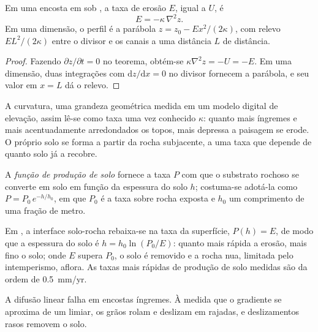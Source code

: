 \begin{proposition}\label{prop:b3:quantitative-geomorphology:curvature}
Em uma encosta em  sob , a taxa de erosão
$E$, igual a $U$, é
\[
E = -\kappa\,\nabla^2 z .
\]
Em uma dimensão, o perfil é a parábola $z = z_0 - E x^2/(2\kappa)$,
com relevo $E L^2/(2\kappa)$ entre o divisor e os canais a uma distância
$L$ de distância.
\end{proposition}

\begin{proof}
Fazendo $\partial z/\partial t = 0$ no teorema, obtém-se $\kappa\nabla^2 z =
-U = -E$. Em uma dimensão, duas integrações com $\mathrm{d}z/\mathrm{d}x =
0$ no divisor fornecem a parábola, e seu valor em $x = L$ dá o relevo.
\end{proof}

A curvatura, uma grandeza geométrica medida em um modelo digital de elevação, assim
lê-se como taxa uma vez conhecido $\kappa$: quanto mais íngremes e mais acentuadamente arredondados
os topos, mais depressa a paisagem se erode. O próprio solo se forma a partir
da rocha subjacente, a uma taxa que depende de quanto solo já a recobre.

\begin{definition}\label{def:b3:quantitative-geomorphology:soil-production}
A \emph{função de produção de solo} fornece
a taxa $P$ com que o substrato rochoso se converte em solo em função da
espessura do solo $h$; costuma-se adotá-la como $P = P_0\,e^{-h/h_0}$, em que
$P_0$ é a taxa sobre rocha exposta e $h_0$ um comprimento de uma fração de metro.
\end{definition}

Em , a interface solo-rocha rebaixa-se na taxa da
superfície, $P(h) = E$, de modo que a espessura do solo é $h = h_0 \ln(P_0/E)$: quanto mais rápida
a erosão, mais fino o solo; onde $E$ supera $P_0$, o solo é
removido e a rocha nua, limitada pelo intemperismo, aflora. As taxas mais rápidas
de produção de solo medidas são da ordem de \qty{0.5}{mm/yr}.

A difusão linear falha em encostas íngremes. À medida que o gradiente se aproxima de um
limiar, os grãos rolam e deslizam em rajadas, e deslizamentos rasos removem o
solo.

